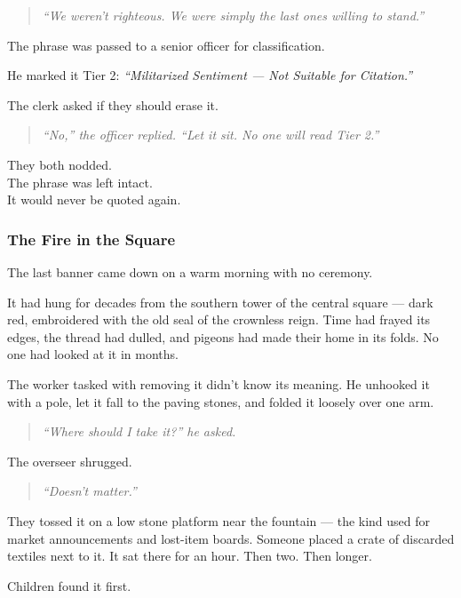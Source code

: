 \documentclass[12pt]{article}
\begin{document}
\begin{quote}
\textit{“We weren’t righteous. We were simply the last ones willing to stand.”}
\end{quote}

The phrase was passed to a senior officer for classification.

He marked it Tier 2: \textit{“Militarized Sentiment --- Not Suitable for Citation.”}

The clerk asked if they should erase it.

\begin{quote}
\textit{“No,” the officer replied. “Let it sit. No one will read Tier 2.”}
\end{quote}

They both nodded.\\
The phrase was left intact.\\
It would never be quoted again.

\dotfill

\subsubsection{The Fire in the Square}

The last banner came down on a warm morning with no ceremony.

It had hung for decades from the southern tower of the central square --- dark red, embroidered with the old seal of the crownless reign. Time had frayed its edges, the thread had dulled, and pigeons had made their home in its folds. No one had looked at it in months.

The worker tasked with removing it didn't know its meaning. He unhooked it with a pole, let it fall to the paving stones, and folded it loosely over one arm.

\begin{quote}
\textit{“Where should I take it?” he asked.}
\end{quote}

The overseer shrugged.

\begin{quote}
\textit{“Doesn’t matter.”}
\end{quote}

They tossed it on a low stone platform near the fountain --- the kind used for market announcements and lost-item boards. Someone placed a crate of discarded textiles next to it. It sat there for an hour. Then two. Then longer.

Children found it first.
\end{document}
